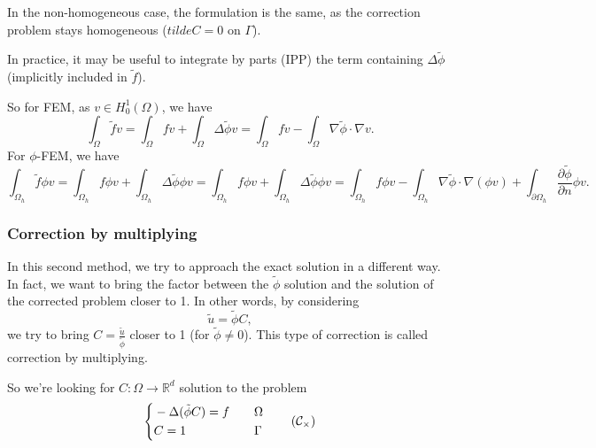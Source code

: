 In the non-homogeneous case, the formulation is the same, as the correction problem stays homogeneous ($tilde{C}=0$ on $\Gamma$).

\begin{Rem}
	In practice, it may be useful to integrate by parts (IPP) the term containing $\Delta \tilde{\phi}$ (implicitly included in $\tilde{f}$).
	
	So for FEM, as $v\in H_0^1(\Omega)$, we have
	\begin{equation*}
		\int_\Omega \tilde{f}v=\int_\Omega fv+\int_\Omega \Delta\tilde{\phi}v=\int_\Omega fv-\int_\Omega \nabla\tilde{\phi}\cdot\nabla v.
	\end{equation*}
	For $\phi$-FEM, we have
	\begin{equation*}
		\int_{\Omega_h} \tilde{f} \phi v=\int_{\Omega_h} f \phi v+\int_{\Omega_h} \Delta\tilde{\phi} \phi v=\int_{\Omega_h} f \phi v+\int_{\Omega_h} \Delta\tilde{\phi} \phi v=\int_{\Omega_h} f \phi v-\int_{\Omega_h} \nabla\tilde{\phi}\cdot\nabla(\phi v)+\int_{\partial\Omega_h} \frac{\partial\tilde{\phi}}{\partial n}\phi v.
	\end{equation*}
\end{Rem}

\subsubsection{Correction by multiplying} \label{Corr.method.mult}

In this second method, we try to approach the exact solution in a different way. In fact, we want to bring the factor between the $\tilde{\phi}$ solution and the solution of the corrected problem closer to 1. In other words, by considering 
\begin{equation*}
	\tilde{u}=\tilde{\phi}C,
\end{equation*}
we try to bring $C=\frac{\tilde{u}}{\tilde{\phi}}$ closer to 1 (for $\tilde{\phi}\ne 0$). This type of correction is called correction by multiplying.

So we're looking for $C: \Omega \rightarrow \mathbb{R}^d$ solution to the problem
\begin{equation}
	\label{eq.corr.pbc_mult}
	\left\{\begin{aligned}
		&-\Delta (\tilde{\phi}C)=f \quad &&\Omega \\
		&C=1 \quad &&\Gamma
	\end{aligned}\right. \tag{$\mathcal{C}_\times$}
\end{equation}

